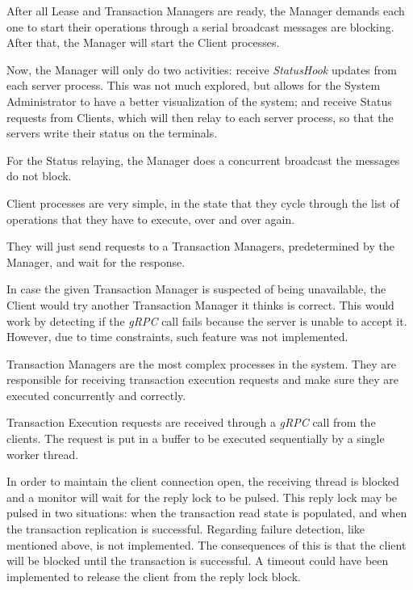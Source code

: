 \documentclass[times, 10pt,twocolumn]{article}
\begin{document}
After all Lease and Transaction Managers are ready, the Manager demands each one to start
their operations through a serial broadcast \textendash messages are blocking.
After that, the Manager will start the Client processes.

Now, the Manager will only do two activities: receive \textit{StatusHook} updates from each server process.
This was not much explored, but allows for the System Administrator to have a better
visualization of the system; and receive Status requests from Clients, which will then relay to
each server process, so that the servers write their status on the terminals.

For the Status relaying, the Manager does a concurrent broadcast \textendash the messages do not block.

Client processes are very simple, in the state that they cycle through the list of operations
that they have to execute, over and over again.

They will just send requests to a Transaction Managers, predetermined by the Manager,
and wait for the response.

In case the given Transaction Manager is suspected of being unavailable,
the Client would try another Transaction Manager it thinks is correct.
This would work by detecting if the \textit{gRPC} call fails because the server is unable
to accept it.
However, due to time constraints, such feature was not implemented.


Transaction Managers are the most complex processes in the system. They are responsible
for receiving transaction execution requests and make sure they are executed concurrently and
correctly.

Transaction Execution requests are received through a \textit{gRPC} call from the clients.
The request is put in a buffer to be executed sequentially by a single worker thread.

In order to maintain the client connection open, the receiving thread is blocked and
a monitor will wait for the reply lock to be pulsed. This reply lock may be pulsed in two situations:
when the transaction read state is populated, and when the transaction replication is successful.
Regarding failure detection, like mentioned above, is not implemented. The consequences of this is that
the client will be blocked until the transaction is successful. A timeout could have been implemented
to release the client from the reply lock block.
\end{document}
